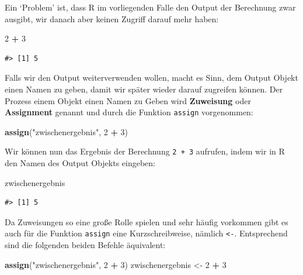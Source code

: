 \documentclass[]{book}
\newenvironment{Shaded}{\begin{snugshade}}{\end{snugshade}}
\newcommand{\KeywordTok}[1]{\textcolor[rgb]{0.13,0.29,0.53}{\textbf{#1}}}
\newcommand{\DecValTok}[1]{\textcolor[rgb]{0.00,0.00,0.81}{#1}}
\newcommand{\StringTok}[1]{\textcolor[rgb]{0.31,0.60,0.02}{#1}}
\newcommand{\OperatorTok}[1]{\textcolor[rgb]{0.81,0.36,0.00}{\textbf{#1}}}
\newcommand{\NormalTok}[1]{#1}
\begin{document}
Ein `Problem' ist, dass R im vorliegenden Falle den Output der
Berechnung zwar ausgibt, wir danach aber keinen Zugriff darauf mehr
haben:

\begin{Shaded}
\begin{Highlighting}[]
\DecValTok{2} \OperatorTok{+}\StringTok{ }\DecValTok{3}
\end{Highlighting}
\end{Shaded}

\begin{verbatim}
#> [1] 5
\end{verbatim}

Falls wir den Output weiterverwenden wollen, macht es Sinn, dem Output
Objekt einen Namen zu geben, damit wir später wieder darauf zugreifen
können. Der Prozess einem Objekt einen Namen zu Geben wird
\textbf{Zuweisung} oder \textbf{Assignment} genannt und durch die
Funktion \texttt{assign} vorgenommen:

\begin{Shaded}
\begin{Highlighting}[]
\KeywordTok{assign}\NormalTok{(}\StringTok{"zwischenergebnis"}\NormalTok{, }\DecValTok{2} \OperatorTok{+}\StringTok{ }\DecValTok{3}\NormalTok{)}
\end{Highlighting}
\end{Shaded}

Wir können nun das Ergebnis der Berechnung \texttt{2\ +\ 3} aufrufen,
indem wir in R den Namen des Output Objekts eingeben:

\begin{Shaded}
\begin{Highlighting}[]
\NormalTok{zwischenergebnis}
\end{Highlighting}
\end{Shaded}

\begin{verbatim}
#> [1] 5
\end{verbatim}

Da Zuweisungen so eine große Rolle spielen und sehr häufig vorkommen
gibt es auch für die Funktion \texttt{assign} eine Kurzschreibweise,
nämlich \texttt{\textless{}-}. Entsprechend sind die folgenden beiden
Befehle äquivalent:

\begin{Shaded}
\begin{Highlighting}[]
\KeywordTok{assign}\NormalTok{(}\StringTok{"zwischenergebnis"}\NormalTok{, }\DecValTok{2} \OperatorTok{+}\StringTok{ }\DecValTok{3}\NormalTok{)}
\NormalTok{zwischenergebnis <-}\StringTok{ }\DecValTok{2} \OperatorTok{+}\StringTok{ }\DecValTok{3}
\end{Highlighting}
\end{Shaded}
\end{document}
